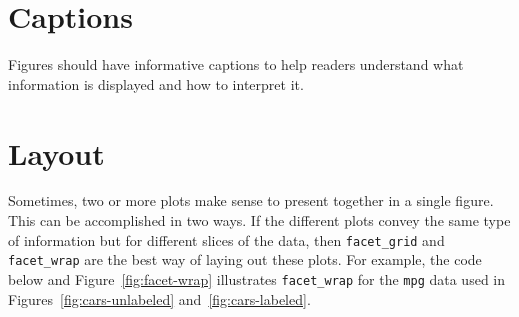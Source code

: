 \documentclass[11pt,letterpaper,english,oneside]{article}\usepackage[]{graphicx}\usepackage[]{xcolor}
\begin{document}
\section{Captions}

Figures should have informative captions to help readers understand what information is displayed and how to interpret it. 

\section{Layout}

Sometimes, two or more plots make sense to present together in a single figure. This can be accomplished in two ways. If the different plots convey the same type of information but for different slices of the data, then \verb|facet_grid| and \verb|facet_wrap| are the best way of laying out these plots. For example, the code below and Figure~\ref{fig:facet-wrap} illustrates \verb|facet_wrap| for the \texttt{mpg} data used in Figures~\ref{fig:cars-unlabeled} and~\ref{fig:cars-labeled}.
\end{document}
